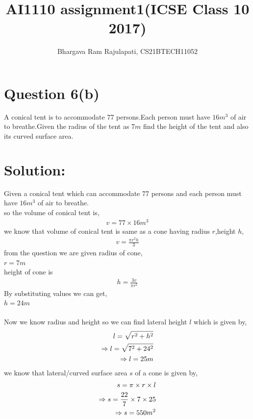 \documentclass[article,12pt,twocolumn]{IEEEtran}
\title{AI1110 assignment1(ICSE Class 10 2017)}
\author{Bhargava Ram Rajulapati, CS21BTECH11052}
\begin{document}
  \maketitle
  \section*{Question 6(b)}
   A conical tent is to accommodate 77 persons.Each person must  
   have $16m^3$ of air to breathe.Given the radius of the tent as
   $7m$ find the height of the tent and also its curved surface
   area.\\
  \section*{Solution:}
  Given a conical tent which can accommodate 77 persons and each         
   person must have $16m^3$ of air to breathe.\\
  so the volume of conical tent is,
  \begin{align*}
    v = 77 \times 16 m^3 
  \end{align*}
  we know that volume of conical tent is same as a cone having
  radius $r$,height $h$,
  \begin{align*}
     v = \frac{\pi r^2 h}{3} 
  \end{align*}
  from the question we are given radius of cone, \\
  $ r = 7 m $\\ 
  height of cone is
  \begin{align*}
   h = \frac{3 v}{\pi r^2} 
  \end{align*}
  By substituting values we can get, \\
  $ h = 24 m $ \\\\
  Now we know radius and height so we can find lateral height $l$
  which is given by,
  \begin{align*}
    \hspace*{12pt} l = \sqrt{r^2 + h^2} \\
    \Rightarrow l = \sqrt{7^2 + 24^2} \\
    \Rightarrow l = 25 m
  \end{align*}
  we know that lateral/curved surface area $s$ of a cone is given
  by,
  \begin{align*}
    \hspace*{12pt} s = \pi \times r \times l \\
    \Rightarrow  s = \frac{22}{7} \times 7 \times 25  \\
    \Rightarrow  s = 550 m^2 
  \end{align*}
   
\end{document}
